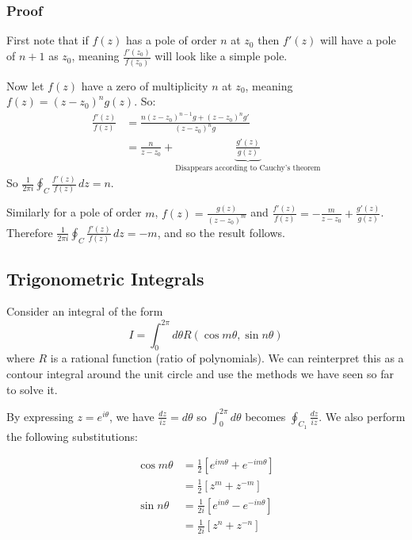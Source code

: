 \documentclass{../../physics_notes}
\begin{document}
\subsubsection*{Proof}

First note that if $f(z)$ has a pole of order $n$ at $z_0$ then $f'(z)$ will have a pole of $n+1$ as $z_0$, meaning $\frac{f'(z_0)}{f(z_0)}$ will look like a simple pole. 

Now let $f(z)$ have a zero of multiplicity $n$ at $z_0$, meaning $f(z) = (z-z_0)^n g(z)$. So:
\begin{align*} 
\frac{f'(z)}{f(z)} &= \frac{n(z-z_0)^{n-1} g + (z-z_0)^n g'}{(z-z_0)^n g} \\
&= \frac{n}{z-z_0} + \underbrace{\frac{g'(z)}{g(z)}}_\text{Disappears according to Cauchy's theorem}
\end{align*}
So $\frac{1}{2\pi i}\oint_C \frac{f'(z)}{f(z)}\, dz = n$.

Similarly for a pole of order $m$, $f(z) = \frac{g(z)}{(z-z_0)^m}$ and $\frac{f'(z)}{f(z)} = -\frac{m}{z-z_0} + \frac{g'(z)}{g(z)}$. Therefore $\frac{1}{2\pi i}\oint_C \frac{f'(z)}{f(z)}\, dz = -m$, and so the result follows. 

\subsection{Trigonometric Integrals }

Consider an integral of the form 
\[ I = \int_{0}^{2\pi} d\theta R(\cos{m\theta}, \sin{n\theta}) \]
where $R$ is a rational function (ratio of polynomials). We can reinterpret this as a contour integral around the unit circle and use the methods we have seen so far to solve it. 

By expressing $z = e^{i\theta}$, we have $\frac{dz}{iz} = d\theta$ so $\int_{0}^{2\pi}d\theta$ becomes $\oint_{C_1} \frac{dz}{iz}$. We also perform the following substitutions:

\begin{align*}
\cos{m\theta} &= \frac{1}{2}\left[e^{im\theta} + e^{-im\theta}\right] \\
&= \frac{1}{2}\left[z^m + z^{-m}\right] \\
\sin{n\theta} &= \frac{1}{2i}\left[e^{in\theta} - e^{-in\theta}\right] \\
&= \frac{1}{2i}\left[z^n + z^{-n}\right] 
\end{align*}
\end{document}
